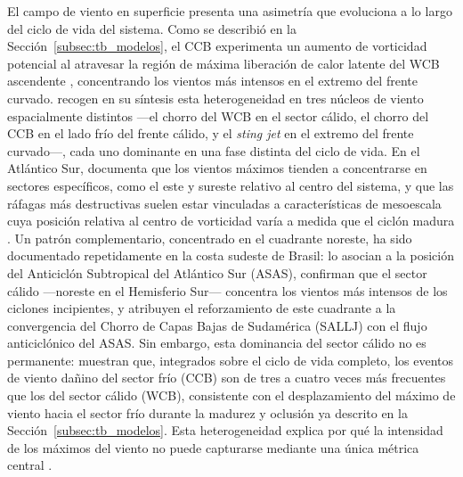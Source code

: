 El campo de viento en superficie presenta una asimetría que evoluciona a lo largo del ciclo de vida del sistema.
Como se describió en la Sección~\ref{subsec:tb_modelos}, el CCB experimenta un aumento de vorticidad potencial al atravesar la región de máxima liberación de calor latente del WCB ascendente \citep{schemm2014linkage}, concentrando los vientos más intensos en el extremo del frente curvado.
\citet{catto2016extratropical} recogen en su síntesis esta heterogeneidad en tres núcleos de viento espacialmente distintos —el chorro del WCB en el sector cálido, el chorro del CCB en el lado frío del frente cálido, y el \textit{sting jet} en el extremo del frente curvado—, cada uno dominante en una fase distinta del ciclo de vida.
En el Atlántico Sur, \citet{cardoso2022synoptic} documenta que los vientos máximos tienden a concentrarse en sectores específicos, como el este y sureste relativo al centro del sistema, y que las ráfagas más destructivas suelen estar vinculadas a características de mesoescala cuya posición relativa al centro de vorticidad varía a medida que el ciclón madura \citep{eisenstein2023identification}.
Un patrón complementario, concentrado en el cuadrante noreste, ha sido documentado repetidamente en la costa sudeste de Brasil: \citet{cardoso2020wind} lo asocian a la posición del Anticiclón Subtropical del Atlántico Sur (ASAS), \citet{dejesus2021multimodel} confirman que el sector cálido —noreste en el Hemisferio Sur— concentra los vientos más intensos de los ciclones incipientes, y \citet{gramcianinov2024early} atribuyen el reforzamiento de este cuadrante a la convergencia del Chorro de Capas Bajas de Sudamérica (SALLJ) con el flujo anticiclónico del ASAS.
Sin embargo, esta dominancia del sector cálido no es permanente: \citet{gentile2023observed} muestran que, integrados sobre el ciclo de vida completo, los eventos de viento dañino del sector frío (CCB) son de tres a cuatro veces más frecuentes que los del sector cálido (WCB), consistente con el desplazamiento del máximo de viento hacia el sector frío durante la madurez y oclusión ya descrito en la Sección~\ref{subsec:tb_modelos}. Esta heterogeneidad explica por qué la intensidad de los máximos del viento no puede capturarse mediante una única métrica central \citep{corner2025classification}.

